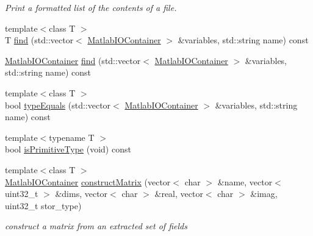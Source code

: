 \begin{DoxyCompactItemize}
\begin{DoxyCompactList}\small\item\em Print a formatted list of the contents of a file. \end{DoxyCompactList}\item 
{\footnotesize template$<$class T $>$ }\\T \hyperlink{classMatlabIO_ae1bcaa4c1311943f9d4705bc1a26f30b}{find} (std\+::vector$<$ \hyperlink{classMatlabIOContainer}{Matlab\+I\+O\+Container} $>$ \&variables, std\+::string name) const 
\item 
\hyperlink{classMatlabIOContainer}{Matlab\+I\+O\+Container} \hyperlink{classMatlabIO_a942611dfb873b5a0130ef2b19e57dad5}{find} (std\+::vector$<$ \hyperlink{classMatlabIOContainer}{Matlab\+I\+O\+Container} $>$ \&variables, std\+::string name) const 
\item 
{\footnotesize template$<$class T $>$ }\\bool \hyperlink{classMatlabIO_a1a33cc9fd234f6c65560706a86869813}{type\+Equals} (std\+::vector$<$ \hyperlink{classMatlabIOContainer}{Matlab\+I\+O\+Container} $>$ \&variables, std\+::string name) const 
\item 
{\footnotesize template$<$typename T $>$ }\\bool \hyperlink{classMatlabIO_a1170728ac5394d9d3d2647dc238838cb}{is\+Primitive\+Type} (void) const 
\item 
{\footnotesize template$<$class T $>$ }\\\hyperlink{classMatlabIOContainer}{Matlab\+I\+O\+Container} \hyperlink{classMatlabIO_a86a5a57fe5ef8f636c2ee8838b3ee172}{construct\+Matrix} (vector$<$ char $>$ \&name, vector$<$ uint32\+\_\+t $>$ \&dims, vector$<$ char $>$ \&real, vector$<$ char $>$ \&imag, uint32\+\_\+t stor\+\_\+type)
\begin{DoxyCompactList}\small\item\em construct a matrix from an extracted set of fields \end{DoxyCompactList}\end{DoxyCompactItemize}
